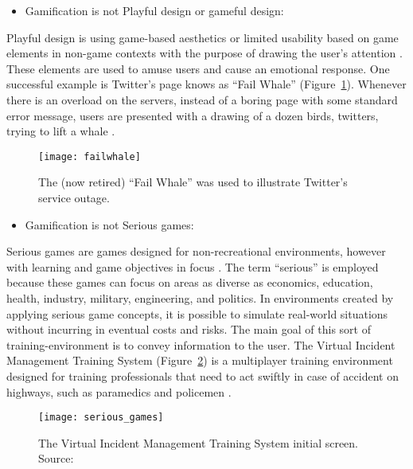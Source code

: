 \begin{itemize}
\item Gamification is not Playful design or gameful design:
\end{itemize}

Playful design is using game-based aesthetics or limited usability
based on game elements in non-game contexts with the purpose of
drawing the user's attention \cite{Ferri2017}. These elements are used to amuse
users and cause an emotional response. One successful example is
Twitter’s page knows as “Fail Whale” (Figure~\ref{fig:failwhale}). Whenever
there is an overload on the servers, instead of a boring page with
some standard error message, users are presented with a drawing of
a dozen birds, twitters, trying to lift a whale \cite{kalbach2016mapping}.

\begin{figure}[h!]
\caption{The (now retired) “Fail Whale” was used to illustrate Twitter's service outage.}
\centering
\texttt{[image: failwhale]}
\label{fig:failwhale}
\end{figure}

\begin{itemize}
\item Gamification is not Serious games:
\end{itemize}

Serious games are games designed for non-recreational
environments, however with learning and game objectives in focus \cite{Blanchard2011}. The term
“serious” is employed because these games can focus on areas as
diverse as economics, education, health, industry, military,
engineering, and politics. In environments created by applying
serious game concepts, it is possible to simulate real-world
situations without incurring in eventual costs and risks. The main
goal of this sort of training-environment is to convey information
to the user. The Virtual Incident Management Training System
(Figure~\ref{fig:serious_games}) is a multiplayer training environment designed for
training professionals that need to act swiftly in case of accident on
highways, such as paramedics and policemen \cite{catt_lab2017}.

\begin{figure}[h!]
\caption{The Virtual Incident Management Training System initial screen. Source: \cite{catt_lab2017}}
\centering
\texttt{[image: serious\_games]}
\label{fig:serious_games}
\end{figure}


